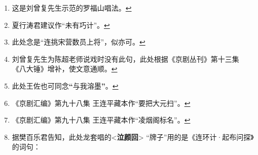\begin{enumerate}
  \protect\hyperlink{fnref538}{↩}
\item
  \leavevmode\hypertarget{fn539}{}%
  这是刘曾复先生示范的罗福山唱法。\protect\hyperlink{fnref539}{↩}
\item
  \leavevmode\hypertarget{fn540}{}%
  夏行涛君建议作``未有巧计''。\protect\hyperlink{fnref540}{↩}
\item
  \leavevmode\hypertarget{fn541}{}%
  此处念是``连挑宋营数员上将''，似亦可。\protect\hyperlink{fnref541}{↩}
\item
  \leavevmode\hypertarget{fn542}{}%
  刘曾复先生为陈超老师说戏时没有此句，此处根据《京剧丛刊》第十三集
  《八大锤》增补，使文意通顺。\protect\hyperlink{fnref542}{↩}
\item
  \leavevmode\hypertarget{fn543}{}%
  此处王佐也可同念\textbf{``}与我溶墨\textbf{''}。\protect\hyperlink{fnref543}{↩}
\item
  \leavevmode\hypertarget{fn544}{}%
  《京剧汇编》第九十八集
  王连平藏本作``要把大元扫''。\protect\hyperlink{fnref544}{↩}
\item
  \leavevmode\hypertarget{fn545}{}%
  《京剧汇编》第九十八集
  王连平藏本作``凌烟阁标名''。\protect\hyperlink{fnref545}{↩}
\item
  \leavevmode\hypertarget{fn546}{}%
  据樊百乐君告知，此处龙套唱的\textless{}\textbf{泣颜回}\textgreater{}
  ``牌子''用的是《连环计·起布问探》的词句：


\end{enumerate}
